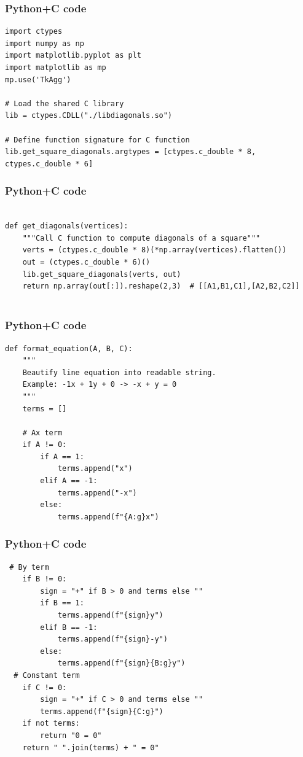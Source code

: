 \documentclass{beamer}
\begin{document}
\begin{frame}[fragile]
    \frametitle{Python+C code}

    \begin{lstlisting}
import ctypes
import numpy as np
import matplotlib.pyplot as plt
import matplotlib as mp
mp.use('TkAgg')

# Load the shared C library
lib = ctypes.CDLL("./libdiagonals.so")

# Define function signature for C function
lib.get_square_diagonals.argtypes = [ctypes.c_double * 8, ctypes.c_double * 6]

    \end{lstlisting}
\end{frame}

\begin{frame}[fragile]
    \frametitle{Python+C code}

    \begin{lstlisting}

def get_diagonals(vertices):
    """Call C function to compute diagonals of a square"""
    verts = (ctypes.c_double * 8)(*np.array(vertices).flatten())
    out = (ctypes.c_double * 6)()
    lib.get_square_diagonals(verts, out)
    return np.array(out[:]).reshape(2,3)  # [[A1,B1,C1],[A2,B2,C2]]


    \end{lstlisting}
\end{frame}

\begin{frame}[fragile]
    \frametitle{Python+C code}

    \begin{lstlisting}
def format_equation(A, B, C):
    """
    Beautify line equation into readable string.
    Example: -1x + 1y + 0 -> -x + y = 0
    """
    terms = []

    # Ax term
    if A != 0:
        if A == 1:
            terms.append("x")
        elif A == -1:
            terms.append("-x")
        else:
            terms.append(f"{A:g}x")

    \end{lstlisting}
\end{frame}

\begin{frame}[fragile]
    \frametitle{Python+C code}

    \begin{lstlisting}
 # By term
    if B != 0:
        sign = "+" if B > 0 and terms else ""
        if B == 1:
            terms.append(f"{sign}y")
        elif B == -1:
            terms.append(f"{sign}-y")
        else:
            terms.append(f"{sign}{B:g}y")
  # Constant term
    if C != 0:
        sign = "+" if C > 0 and terms else ""
        terms.append(f"{sign}{C:g}")
    if not terms:
        return "0 = 0"
    return " ".join(terms) + " = 0"
    \end{lstlisting}
\end{frame}
\end{document}
